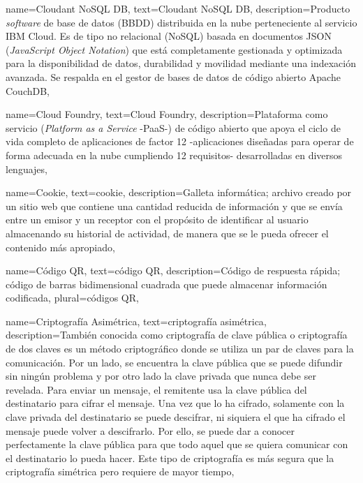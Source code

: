{
    name={Cloudant NoSQL DB},
    text={Cloudant NoSQL DB},
    description={Producto \textit{software} de base de datos (BBDD) distribuida en la nube perteneciente al servicio IBM Cloud. Es de tipo no relacional (NoSQL) basada en documentos JSON (\textit{JavaScript Object Notation}) que está completamente gestionada y optimizada para la disponibilidad de datos, durabilidad y movilidad mediante una indexación avanzada. Se respalda en el gestor de bases de datos de código abierto Apache CouchDB},
}

{
    name={Cloud Foundry},
    text={Cloud Foundry},
    description={Plataforma como servicio (\textit{Platform as a Service} -PaaS-) de código abierto que apoya el ciclo de vida completo de aplicaciones de factor 12 -aplicaciones diseñadas para operar de forma adecuada en la nube cumpliendo 12 requisitos- desarrolladas en diversos lenguajes},
}

{
    name={Cookie},
    text={cookie},
    description={Galleta informática; archivo creado por un sitio web que contiene una cantidad reducida de información y que se envía entre un emisor y un receptor con el propósito de identificar al usuario almacenando su historial de actividad, de manera que se le pueda ofrecer el contenido más apropiado},
}

{
    name={Código QR},
    text={código QR},
    description={Código de respuesta rápida; código de barras bidimensional cuadrada que puede almacenar información codificada},
    plural={códigos QR},
}

{
    name={Criptografía Asimétrica},
    text={criptografía asimétrica},
    description={También conocida como criptografía de clave pública o criptografía de dos claves es un método criptográfico donde se utiliza un par de claves para la comunicación. Por un lado, se encuentra la clave pública que se puede difundir sin ningún problema y por otro lado la clave privada que nunca debe ser revelada. Para enviar un mensaje, el remitente usa la clave pública del destinatario para cifrar el mensaje. Una vez que lo ha cifrado, solamente con la clave privada del destinatario se puede descifrar, ni siquiera el que ha cifrado el mensaje puede volver a descifrarlo. Por ello, se puede dar a conocer perfectamente la clave pública para que todo aquel que se quiera comunicar con el destinatario lo pueda hacer. Este tipo de criptografía es más segura que la criptografía simétrica pero requiere de mayor tiempo},
}

